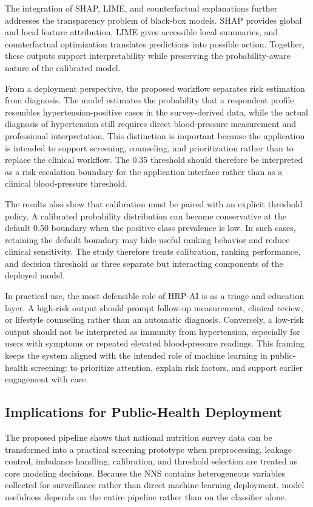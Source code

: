 \documentclass[journal]{IEEEtran}
\begin{document}
The integration of SHAP, LIME, and counterfactual explanations further addresses the transparency problem of black-box models. SHAP provides global and local feature attribution, LIME gives accessible local summaries, and counterfactual optimization translates predictions into possible action. Together, these outputs support interpretability while preserving the probability-aware nature of the calibrated model.

From a deployment perspective, the proposed workflow separates risk estimation from diagnosis. The model estimates the probability that a respondent profile resembles hypertension-positive cases in the survey-derived data, while the actual diagnosis of hypertension still requires direct blood-pressure measurement and professional interpretation. This distinction is important because the application is intended to support screening, counseling, and prioritization rather than to replace the clinical workflow. The 0.35 threshold should therefore be interpreted as a risk-escalation boundary for the application interface rather than as a clinical blood-pressure threshold.

The results also show that calibration must be paired with an explicit threshold policy. A calibrated probability distribution can become conservative at the default 0.50 boundary when the positive class prevalence is low. In such cases, retaining the default boundary may hide useful ranking behavior and reduce clinical sensitivity. The study therefore treats calibration, ranking performance, and decision threshold as three separate but interacting components of the deployed model.

In practical use, the most defensible role of HRP-AI is as a triage and education layer. A high-risk output should prompt follow-up measurement, clinical review, or lifestyle counseling rather than an automatic diagnosis. Conversely, a low-risk output should not be interpreted as immunity from hypertension, especially for users with symptoms or repeated elevated blood-pressure readings. This framing keeps the system aligned with the intended role of machine learning in public-health screening: to prioritize attention, explain risk factors, and support earlier engagement with care.



\subsection{Implications for Public-Health Deployment}
The proposed pipeline shows that national nutrition survey data can be transformed into a practical screening prototype when preprocessing, leakage control, imbalance handling, calibration, and threshold selection are treated as core modeling decisions. Because the NNS contains heterogeneous variables collected for surveillance rather than direct machine-learning deployment, model usefulness depends on the entire pipeline rather than on the classifier alone.
\end{document}
